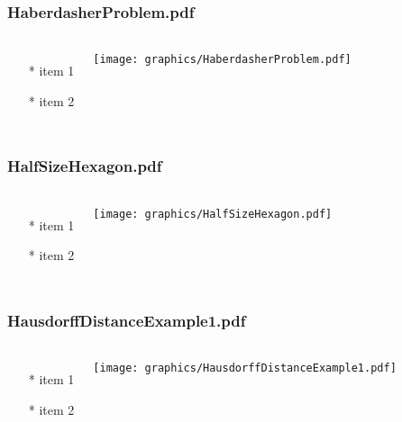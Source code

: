 \begin{frame} \frametitle{HaberdasherProblem.pdf}
    \begin{columns}[c]
        \begin{itemize}
            \item[*] item 1
            \item[*] item 2
        \end{itemize}
        \begin{minipage}{\linewidth}
            \begin{center}
            \texttt{[image: graphics/HaberdasherProblem.pdf]}
            \label{gfx:HaberdasherProblem.pdf}
            \end{center}
        \end{minipage}
    \end{columns}
\end{frame}
\begin{frame} \frametitle{HalfSizeHexagon.pdf}
    \begin{columns}[c]
        \begin{itemize}
            \item[*] item 1
            \item[*] item 2
        \end{itemize}
        \begin{minipage}{\linewidth}
            \begin{center}
            \texttt{[image: graphics/HalfSizeHexagon.pdf]}
            \label{gfx:HalfSizeHexagon.pdf}
            \end{center}
        \end{minipage}
    \end{columns}
\end{frame}
\begin{frame} \frametitle{HausdorffDistanceExample1.pdf}
    \begin{columns}[c]
        \begin{itemize}
            \item[*] item 1
            \item[*] item 2
        \end{itemize}
        \begin{minipage}{\linewidth}
            \begin{center}
            \texttt{[image: graphics/HausdorffDistanceExample1.pdf]}
            \label{gfx:HausdorffDistanceExample1.pdf}
            \end{center}
        \end{minipage}
    \end{columns}
\end{frame}
